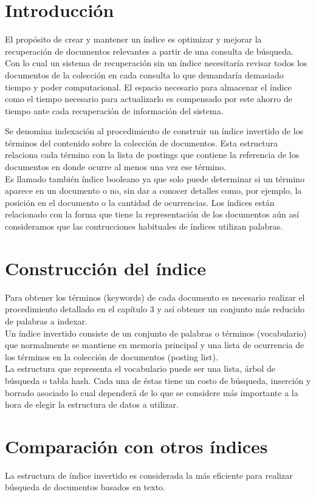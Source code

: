 
\section{Introducción}

El propósito de crear y mantener un índice es optimizar y mejorar la recuperación de documentos relevantes a partir de una consulta de búsqueda. Con lo cual un sistema de recuperación sin un índice necesitaría revisar todos los documentos de la colección en cada consulta lo que demandaría demasiado tiempo y poder computacional. El espacio necesario para almacenar el índice como el tiempo necesario para actualizarlo es compensado por este ahorro de tiempo ante cada recuperación de información del sistema. \par

Se denomina indexación al procedimiento de construir un índice invertido de los términos del contenido sobre la colección de documentos. Esta estructura relaciona cada término con la lista de postings que contiene la referencia de los documentos en donde ocurre al menos una vez ese término. \\
Es llamado también índice booleano ya que solo puede determinar si un término aparece en un documento o no, sin dar a conocer detalles como, por ejemplo, la posición en el documento o la cantidad de ocurrencias. Los índices están relacionado con la forma que tiene la representación de los documentos aún así consideramos que las contrucciones habituales de índices utilizan palabras.\par


\section{Construcción del índice}

Para obtener los términos (keywords) de cada documento es necesario realizar el procedimiento detallado en el capítulo 3 y así obtener un conjunto más reducido de palabras a indexar. \\
Un índice invertido consiste de un conjunto de palabras o términos (vocabulario) que normalmente se mantiene en memoria principal y una lista de ocurrencia de los términos en la colección de documentos (posting list).\\
La estructura que representa el vocabulario puede ser una lista, árbol de búsqueda o tabla hash. Cada una de éstas tiene un costo de búsqueda, inserción y borrado asociado lo cual dependerá de lo que se considere más importante a la hora de elegir la estructura de datos a utilizar.\\

\section{Comparación con otros índices}
La estructura de índice invertido es considerada la más eficiente para realizar búsqueda de documentos basados en texto.